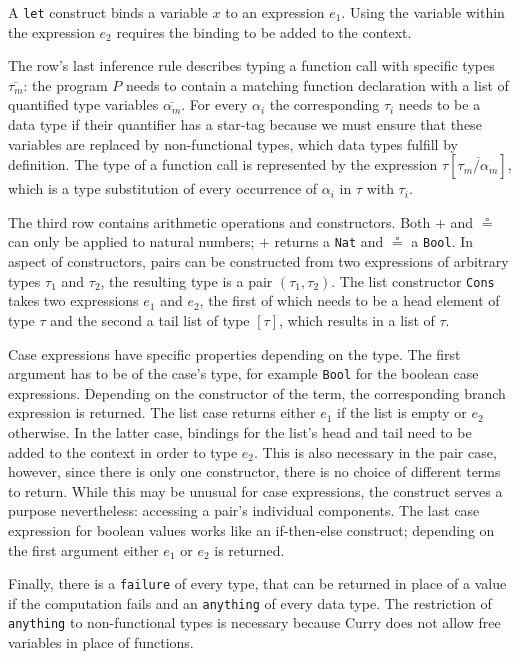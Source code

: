 \documentclass[paper = a4, fleqn, abstract=on, twoside]{scrreprt}
\begin{document}
A \texttt{let} construct binds a variable $x$ to an expression $e_{1}$. Using the variable within the expression $e_{2}$ requires the binding to be added to the context.
\par
The row's last inference rule describes typing a function call with specific types $\overline{\tau_{m}}$: the program $P$ needs to contain a matching function declaration with a list of quantified type variables $\overline{\alpha_{m}}$. For every $\alpha_{i}$ the corresponding $\tau_{i}$ needs to be a data type if their quantifier has a star-tag because we must ensure that these variables are replaced by non-functional types, which data types fulfill by definition. The type of a function call is represented by the expression $\tau [\overline{\tau_{m}/\alpha_{m}}]$, which is a type substitution of every occurrence of $\alpha_{i}$ in $\tau$ with $\tau_{i}$.
\par
The third row contains arithmetic operations and constructors. Both $+$ and $\circeq$ can only be applied to natural numbers; $+$ returns a \texttt{Nat} and $\circeq$ a \texttt{Bool}. In aspect of constructors, pairs can be constructed from two expressions of arbitrary types $\tau_{1}$ and $\tau_{2}$, the resulting type is a pair $(\tau_{1}, \tau_{2})$. The list constructor \texttt{Cons} takes two expressions $e_{1}$ and $e_{2}$, the first of which needs to be a head element of type $\tau$ and the second a tail list of type $[\tau]$, which results in a list of $\tau$.
\par
Case expressions have specific properties depending on the type. The first argument has to be of the case's type, for example \texttt{Bool} for the boolean case expressions. Depending on the constructor of the term, the corresponding branch expression is returned. The list case returns either $e_{1}$ if the list is empty or $e_{2}$ otherwise. In the latter case, bindings for the list's head and tail need to be added to the context in order to type $e_{2}$. This is also necessary in the pair case, however, since there is only one constructor, there is no choice of different terms to return. While this may be unusual for case expressions, the construct serves a purpose nevertheless: accessing a pair's individual components. The last case expression for boolean values works like an if-then-else construct; depending on the first argument either $e_{1}$ or $e_{2}$ is returned.
\par
Finally, there is a \texttt{failure} of every type, that can be returned in place of a value if the computation fails and an \texttt{anything} of every data type. The restriction of \texttt{anything} to non-functional types is necessary because Curry does not allow free variables in place of functions.\\
\end{document}
